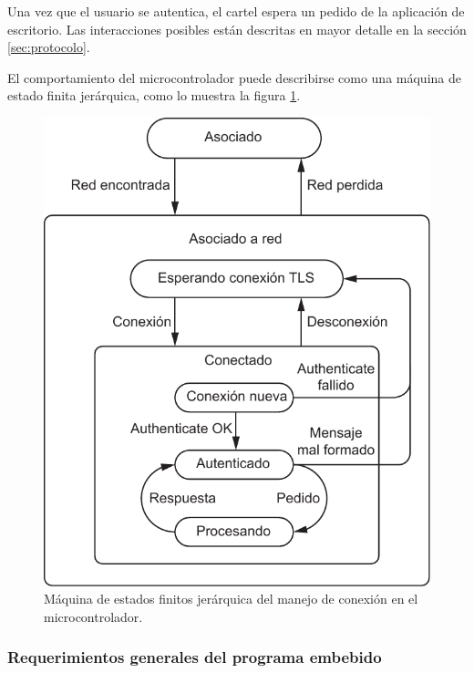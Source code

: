 Una vez que el usuario se autentica, el cartel espera un pedido de la aplicación de escritorio. Las interacciones posibles están descritas en mayor detalle en la sección \ref{sec:protocolo}.

El comportamiento del microcontrolador puede describirse como una máquina de estado finita jerárquica, como lo muestra la figura \ref{fig:fsm-micro}.

\begin{figure}[ht!]
	\begin{center}
		\centering
		\includegraphics[scale=0.8]{imagenes/fsm-micro.pdf}
		\caption{Máquina de estados finitos jerárquica del manejo de conexión en el microcontrolador.}
		\label{fig:fsm-micro}
	\end{center}
\end{figure}



\subsubsection{Requerimientos generales del programa embebido}

